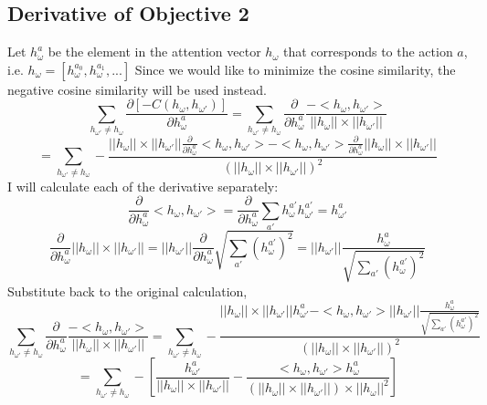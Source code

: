 \documentclass{article}
\begin{document}
	\subsection{Derivative of Objective 2}
	Let $h_\omega^a$ be the element in the attention vector $h_\omega$ that corresponds to the action $a$, i.e. $h_\omega = [h_\omega^{a_0}, h_\omega^{a_1}, ...]$
	Since we would like to minimize the cosine similarity, the negative cosine similarity will be used instead.
	$$\sum_{h_{\omega '} \neq h_\omega} \frac{\partial [-C(h_\omega, h_{\omega '})]}{\partial h_\omega^a} = \sum_{h_{\omega '} \neq h_\omega} \frac{\partial}{\partial h_\omega^a} \frac{-<h_\omega, h_{\omega '}>}{||h_\omega||\times||h_{\omega '}||}$$
	$$= \sum_{h_{\omega '} \neq h_\omega} - \frac{||h_\omega||\times||h_{\omega '}|| \frac{\partial}{\partial h_\omega^a} <h_\omega, h_{\omega '}> - <h_\omega, h_{\omega '}> \frac{\partial}{\partial h_\omega^a} ||h_\omega||\times||h_{\omega '}||}{(||h_\omega||\times||h_{\omega '}||)^2}$$
	I will calculate each of the derivative separately:
	$$\frac{\partial}{\partial h_\omega^a} <h_\omega, h_{\omega '}> = \frac{\partial}{\partial h_\omega^a} \sum_{a'}h_\omega^{a'} h_{\omega '}^{a'} = h_{\omega '}^a$$
	$$\frac{\partial}{\partial h_\omega^a} ||h_\omega||\times||h_{\omega '}|| = ||h_{\omega '}|| \frac{\partial}{\partial h_\omega^a} \sqrt{\sum_{a'}(h_\omega^{a'})^2} = ||h_{\omega '}|| \frac{h_\omega^a}{\sqrt{\sum_{a'}(h_\omega^{a'})^2}}$$
	Substitute back to the original calculation,
	$$\sum_{h_{\omega '} \neq h_\omega} \frac{\partial}{\partial h_\omega^a} \frac{-<h_\omega, h_{\omega '}>}{||h_\omega||\times||h_{\omega '}||} = \sum_{h_{\omega '} \neq h_\omega} - \frac{||h_\omega||\times||h_{\omega '}|| h_{\omega '}^a - <h_\omega, h_{\omega '}> ||h_{\omega '}|| \frac{h_\omega^a}{\sqrt{\sum_{a'}(h_\omega^{a'})^2}}}{(||h_\omega||\times||h_{\omega '}||)^2}$$
	$$= \sum_{h_{\omega '} \neq h_\omega} -[\frac{h_{\omega '}^a}{||h_\omega||\times||h_{\omega '}||} - \frac{<h_\omega, h_{\omega '}> h_\omega^a}{(||h_\omega||\times||h_{\omega '}||)\times||h_{\omega}||^2}]$$
\end{document}
